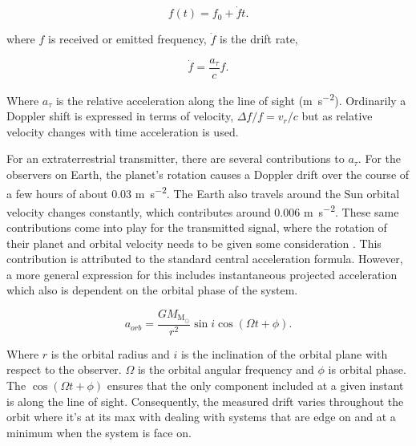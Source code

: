 \begin{equation}
    f(t) = f_0 +\dot f t. 
\end{equation}

where $f$ is received or emitted frequency, $\dot f$ is the drift rate, 

\begin{equation}
    \dot f = \frac{a_\tau}{c} f. 
\end{equation}

Where $a_\tau$ is the relative acceleration along the line of sight (\si{\metre\per\square\second}). Ordinarily a Doppler shift is expressed in terms of velocity, $\Delta f/f = v_r/c$ but as relative velocity changes with time acceleration is used. 

For an extraterrestrial transmitter, there are several contributions to $a_\tau$. For the observers on Earth, the planet's rotation causes a Doppler drift over the course of a few hours of about 0.03 \si{\metre\per\square\second}. The Earth also travels around the Sun orbital velocity changes constantly, which contributes around 0.006 \si{\metre\per\square\second}. These same contributions come into play for the transmitted signal, where the rotation of their planet and orbital velocity needs to be given some consideration \citep{2019ApJSofiaMaxDriftRate}. This contribution is attributed to the standard central acceleration formula. However, a more general expression for this includes instantaneous projected acceleration which also is dependent on the orbital phase of the system. 





\begin{equation}
    a_{orb} = \frac{GM_{\text{M}_\odot}}{r^2} \sin i \cos (\Omega t + \phi). 
    \label{eq:doppler_drift_los_orb}
\end{equation}

Where $r$ is the orbital radius and $i$ is the inclination of the orbital plane with respect to the observer. $\Omega$ is the orbital angular frequency and $\phi$ is orbital phase. The $\cos (\Omega t + \phi)$ ensures that the only component included at a given instant is along the line of sight. Consequently, the measured drift varies throughout the orbit where it's at its max with dealing with systems that are edge on and at a minimum when the system is face on. 

